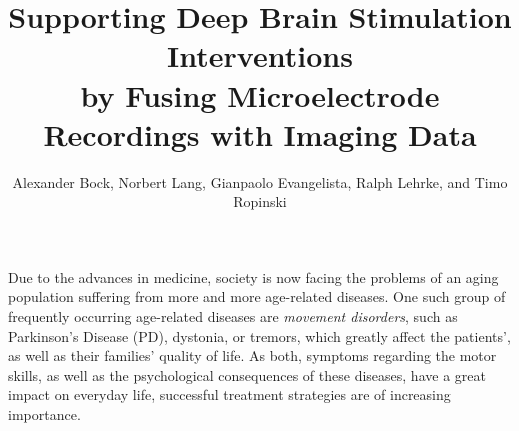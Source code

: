 \documentclass{vgtc}                          %
\title{Supporting Deep Brain Stimulation Interventions \\ by Fusing Microelectrode Recordings with Imaging Data}
\author{Alexander Bock, Norbert Lang, Gianpaolo Evangelista, Ralph Lehrke, and Timo Ropinski}
\begin{document}
\label{sec:introduction}

\maketitle

%
%
Due to the advances in medicine, society is now facing the problems of an aging population suffering from more and more age-related diseases. One such group of frequently occurring age-related diseases are \emph{movement disorders}, such as Parkinson's Disease (PD), dystonia, or tremors, which greatly affect the patients', as well as their families' quality of life. As both, symptoms regarding the motor skills, as well as the psychological consequences of these diseases, have a great impact on everyday life, successful treatment strategies are of increasing importance.
\end{document}
